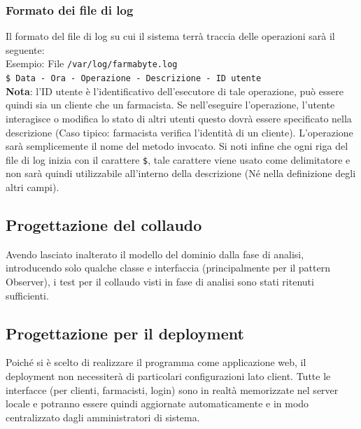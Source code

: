 \subsubsection{Formato dei file di log}

Il formato del file di log su cui il sistema terrà traccia delle operazioni
sarà il seguente:\\

Esempio: File \texttt{/var/log/farmabyte.log}\\

\texttt{\$ Data - Ora - Operazione - Descrizione - ID utente}\\
\textbf{Nota}: l'ID utente è l'identificativo dell'esecutore di tale operazione, può essere quindi sia un cliente che un farmacista.
Se nell'eseguire l'operazione, l'utente interagisce o modifica lo stato di altri utenti questo dovrà essere specificato nella descrizione (Caso tipico: farmacista verifica l'identità di un cliente).
L'operazione sarà semplicemente il nome del metodo invocato.
Si noti infine che ogni riga del file di log inizia con il carattere \texttt{\$}, tale carattere viene usato come delimitatore e non sarà quindi utilizzabile all'interno della descrizione (Né nella definizione degli altri campi).

\newpage

\subsection{Progettazione del collaudo}

Avendo lasciato inalterato il modello del dominio dalla fase di analisi, introducendo solo qualche classe e interfaccia (principalmente per il pattern Observer),
i test per il collaudo visti in fase di analisi sono stati ritenuti sufficienti.

\vspace{2em}

\subsection{Progettazione per il deployment}

Poiché si è scelto di realizzare il programma come applicazione web, il deployment non necessiterà di particolari configurazioni lato client.
Tutte le interfacce (per clienti, farmacisti, login) sono in realtà memorizzate nel server locale e potranno essere quindi aggiornate automaticamente e in modo centralizzato dagli amministratori di sistema.

